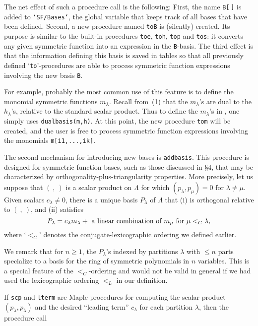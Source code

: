 The net effect of such a procedure call is the following: First, the
name {\tt B[$\,$]} is added to {\tt `SF/Bases`}, the global variable that
keeps track of all bases that have been defined. Second, a new procedure
named {\tt toB} is (silently) created. Its purpose is similar to the
built-in procedures {\tt toe}, {\tt toh}, {\tt top} and {\tt tos}:
it converts any given symmetric function into an expression in the
{\tt B}-basis. The third effect is that the information defining this
basis is saved in tables so that all previously defined
`{\tt to}'-procedures are able to process symmetric function expressions
involving the new basis {\tt B}.

For example, probably the most common use of this feature is to define
the monomial symmetric functions $m_\lambda$. Recall from~(1) that the
$m_\lambda$'s are dual to the $h_\lambda$'s, relative to the standard
scalar product. Thus to define the $m_\lambda$'s in \SF, one simply uses
{\tt dual\ul{}basis(m,h)}. At this point, the new procedure {\tt tom}
will be created, and the user is free to process symmetric function
expressions involving the monomials {\tt m[i\ul{}1,...,i\ul{}k]}.

\medskip
The second mechanism for introducing new bases is {\tt add\ul{}basis}.
This procedure is designed for symmetric function bases, such as those
discussed in \S4, that may be characterized by
orthogonality-plus-triangularity properties. More precisely, let us
suppose that $(\ {,}\ )$ is a scalar product on $\Lambda$ for which
$(p_\lambda,p_\mu)=0$ for $\lambda\ne\mu$. Given scalars $c_\lambda\ne0$,
there is a unique basis $P_\lambda$ of $\Lambda$ that (i) is orthogonal
relative to $(\ {,}\ )$, and (ii) satisfies
$$
P_\lambda=c_\lambda m_\lambda
  +\hbox{ a linear combination of $m_\mu$ for }\mu<_C\lambda,
$$
where `$<_C$' denotes the conjugate-lexicographic ordering
we defined earlier.

We remark that for $n\ge1$, the $P_\lambda$'s indexed by partitions
$\lambda$ with $\le n$ parts specialize to a basis for the ring of
symmetric polynomials in $n$ variables. This is a special feature of
the $<_C$-ordering and would not be valid in general if we had used the
lexicographic ordering $<_L$ in our definition.

If {\tt scp} and {\tt lterm} are Maple procedures for computing the
scalar product $(p_\lambda,p_\lambda)$ and the desired ``leading term''
$c_\lambda$ for each partition $\lambda$, then the procedure call

